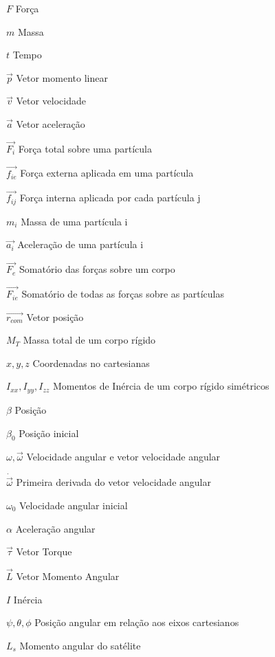 \begin{simbolos}
  \item[$F$] Força
  \item[$m$] Massa
  \item[$t$] Tempo
  \item[$\vec{p}$] Vetor momento linear
  \item[$\vec{v}$] Vetor velocidade
  \item[$\vec{a}$] Vetor aceleração
  \item[$\vec{F_i}$] Força total sobre uma partícula
  \item[$\vec{f_{ie}}$] Força externa aplicada em uma partícula
  \item[$\vec{f_{ij}}$] Força interna aplicada por cada partícula j
  \item[$m_i$] Massa de uma partícula i
  \item[$\vec{a_i}$] Aceleração de uma partícula i
  \item[$\vec{F_e}$] Somatório das forças sobre um corpo
  \item[$\vec{F_{ie}}$] Somatório de todas as forças sobre as partículas
  \item[$\vec{r_{com}}$] Vetor posição 
  \item[$M_T$] Massa total de um corpo rígido
  \item[$x,y,z$] Coordenadas no cartesianas
  \item[$I_{xx}, I_{yy},  I_{zz}$] Momentos de Inércia de um corpo rígido simétricos 
  \item[$\beta$] Posição
  \item[$\beta_0$] Posição inicial
  \item[$\omega,  \vec{\omega}$] Velocidade angular e vetor velocidade angular
  \item[$\dot{\vec{\omega}}$] Primeira derivada do vetor velocidade angular
  \item[$\omega_0$] Velocidade angular inicial
  \item[$\alpha$] Aceleração angular
  \item[$\vec{\tau}$] Vetor Torque
  \item[$\vec{L}$] Vetor Momento Angular
  \item[$I$] Inércia
  \item[$\psi, \theta, \phi$] Posição angular em relação aos eixos cartesianos
  \item[$L_s$] Momento angular do satélite

\end{simbolos}
